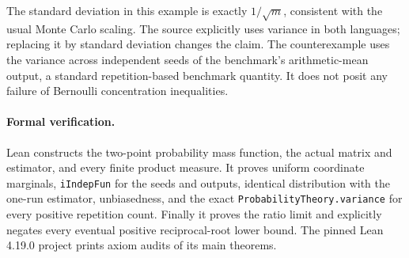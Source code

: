 \documentclass[11pt]{article}
\begin{document}
The standard deviation in this example is exactly $1/\sqrt m$, consistent with the usual Monte Carlo scaling. The source explicitly uses variance in both languages; replacing it by standard deviation changes the claim. The counterexample uses the variance across independent seeds of the benchmark's arithmetic-mean output, a standard repetition-based benchmark quantity. It does not posit any failure of Bernoulli concentration inequalities.

\paragraph{Formal verification.}
Lean constructs the two-point probability mass function, the actual matrix and estimator, and every finite product measure. It proves uniform coordinate marginals, \texttt{iIndepFun} for the seeds and outputs, identical distribution with the one-run estimator, unbiasedness, and the exact \texttt{ProbabilityTheory.variance} for every positive repetition count. Finally it proves the ratio limit and explicitly negates every eventual positive reciprocal-root lower bound. The pinned Lean 4.19.0 project prints axiom audits of its main theorems.
\end{document}
